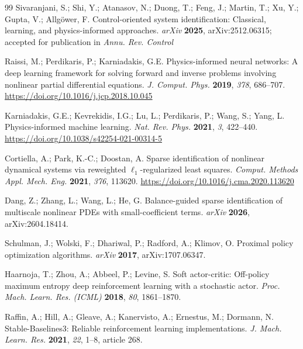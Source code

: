 \begin{thebibliography}{99}
Sivaranjani, S.; Shi, Y.; Atanasov, N.; Duong, T.; Feng, J.; Martin, T.; Xu, Y.; Gupta, V.;
Allg\"ower, F. Control-oriented system identification: Classical, learning, and
physics-informed approaches. \textit{arXiv} \textbf{2025}, arXiv:2512.06315; accepted for
publication in \textit{Annu. Rev. Control}

Raissi, M.; Perdikaris, P.; Karniadakis, G.E. Physics-informed neural networks: A deep
learning framework for solving forward and inverse problems involving nonlinear partial
differential equations. \textit{J. Comput. Phys.} \textbf{2019}, \textit{378}, 686--707.
\url{https://doi.org/10.1016/j.jcp.2018.10.045}

Karniadakis, G.E.; Kevrekidis, I.G.; Lu, L.; Perdikaris, P.; Wang, S.; Yang, L.
Physics-informed machine learning. \textit{Nat. Rev. Phys.} \textbf{2021}, \textit{3},
422--440. \url{https://doi.org/10.1038/s42254-021-00314-5}

Cortiella, A.; Park, K.-C.; Doostan, A. Sparse identification of nonlinear dynamical systems
via reweighted $\ell_1$-regularized least squares. \textit{Comput. Methods Appl. Mech. Eng.}
\textbf{2021}, \textit{376}, 113620. \url{https://doi.org/10.1016/j.cma.2020.113620}

Dang, Z.; Zhang, L.; Wang, L.; He, G. Balance-guided sparse identification of multiscale
nonlinear PDEs with small-coefficient terms. \textit{arXiv} \textbf{2026}, arXiv:2604.18414.

Schulman, J.; Wolski, F.; Dhariwal, P.; Radford, A.; Klimov, O. Proximal policy optimization
algorithms. \textit{arXiv} \textbf{2017}, arXiv:1707.06347.

Haarnoja, T.; Zhou, A.; Abbeel, P.; Levine, S. Soft actor-critic: Off-policy maximum entropy
deep reinforcement learning with a stochastic actor. \textit{Proc. Mach. Learn. Res. (ICML)}
\textbf{2018}, \textit{80}, 1861--1870.

Raffin, A.; Hill, A.; Gleave, A.; Kanervisto, A.; Ernestus, M.; Dormann, N.
Stable-Baselines3: Reliable reinforcement learning implementations. \textit{J. Mach. Learn.
Res.} \textbf{2021}, \textit{22}, 1--8, article 268.


\end{thebibliography}
